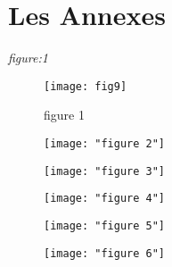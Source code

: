 \documentclass[a4paper]{article}
\begin{document}






\section{Les Annexes}

\textit{figure:1}
\begin{figure}[h!]
	\centering
	\texttt{[image: fig9]}
	\caption{figure 1}
	\label{fig:fig1O}
\end{figure}
		
\begin{figure}
	\centering
	\texttt{[image: "figure 2"]}
	\caption{}
	\label{fig:figure-2}
\end{figure}
\begin{figure}
	\centering
	\texttt{[image: "figure 3"]}
	\caption{}
	\label{fig:figure-3}
\end{figure}

\begin{figure}
	\centering
	\texttt{[image: "figure 4"]}
	\caption{}
	\label{fig:figure-4}
\end{figure}
\begin{figure}
	\centering
	\texttt{[image: "figure 5"]}
	\caption{}
	\label{fig:figure-5}
\end{figure}


\begin{figure}[h!]
\centering
\texttt{[image: "figure 6"]}
\caption{}
\label{fig:figure-6}
\end{figure}
\end{document}
